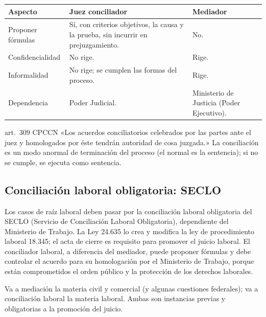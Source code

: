 \documentclass[12pt,oneside]{book}
\renewcommand{\arraystretch}{1.15}
\begin{document}
\begin{table}[H]
\centering
\renewcommand{\arraystretch}{1.25}
\begin{tabularx}{\textwidth}{>{\RaggedRight\arraybackslash}p{}>{\RaggedRight\arraybackslash}X>{\RaggedRight\arraybackslash}X}
\toprule
\textbf{Aspecto} & \textbf{Juez conciliador} & \textbf{Mediador} \\
\midrule
Proponer fórmulas & Sí, con criterios objetivos, la causa y la prueba, sin incurrir en prejuzgamiento. & No. \\
Confidencialidad & No rige. & Rige. \\
Informalidad & No rige; se cumplen las formas del proceso. & Rige. \\
Dependencia & Poder Judicial. & Ministerio de Justicia (Poder Ejecutivo). \\
\bottomrule
\end{tabularx}
\end{table}

\begin{regla}{art.~309 CPCCN}
«Los acuerdos conciliatorios celebrados por las partes ante el juez y homologados por éste tendrán autoridad de cosa juzgada.» La conciliación es un modo anormal de terminación del proceso (el normal es la sentencia); si no se cumple, se ejecuta como sentencia.
\end{regla}

\subsection{Conciliación laboral obligatoria: SECLO}

Los casos de raíz laboral deben pasar por la conciliación laboral obligatoria del SECLO (Servicio de Conciliación Laboral Obligatoria), dependiente del Ministerio de Trabajo. La Ley 24.635 lo crea y modifica la ley de procedimiento laboral 18.345; el acta de cierre es requisito para promover el juicio laboral. El conciliador laboral, a diferencia del mediador, puede proponer fórmulas y debe controlar el acuerdo para su homologación por el Ministerio de Trabajo, porque están comprometidos el orden público y la protección de los derechos laborales.

\begin{importante}
Va a mediación la materia civil y comercial (y algunas cuestiones federales); va a conciliación laboral la materia laboral. Ambas son instancias previas y obligatorias a la promoción del juicio.
\end{importante}
\end{document}
